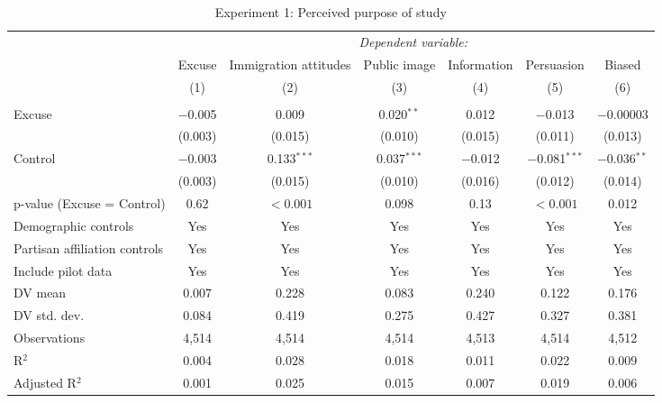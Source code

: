 
\begin{table}[!htbp] \centering 
  \caption{Experiment 1: Perceived purpose of study} 
  \label{t:2-purpose} 
\begin{threeparttable}
\begin{tabular}{@{\hspace{5pt}}l@{\hspace{5pt}}cccccc} 
\toprule 
 & \multicolumn{6}{c}{\textit{Dependent variable:}} \\ 
\cmidrule(rr){2-7} 
 & Excuse & Immigration attitudes & Public image & Information & Persuasion & Biased \\ 
 & (1) & (2) & (3) & (4) & (5) & (6)\\ 
\midrule  
\\[-2.1ex] Excuse & $-$0.005 & 0.009 & 0.020$^{**}$ & 0.012 & $-$0.013 & $-$0.00003 \\ 
  & (0.003) & (0.015) & (0.010) & (0.015) & (0.011) & (0.013) \\ 
 \addlinespace 
 Control & $-$0.003 & 0.133$^{***}$ & 0.037$^{***}$ & $-$0.012 & $-$0.081$^{***}$ & $-$0.036$^{**}$ \\ 
  & (0.003) & (0.015) & (0.010) & (0.016) & (0.012) & (0.014) \\ 
 \addlinespace 
p-value (Excuse = Control) & 0.62 & $<0.001$ & 0.098 & 0.13 & $<0.001$ & 0.012 \\ 
\midrule  
Demographic controls & Yes & Yes & Yes & Yes & Yes & Yes \\ 
Partisan affiliation controls & Yes & Yes & Yes & Yes & Yes & Yes \\ 
\midrule
Include pilot data & Yes & Yes & Yes & Yes & Yes & Yes \\
\addlinespace
DV mean & 0.007 & 0.228 & 0.083 & 0.240 & 0.122 & 0.176 \\
DV std. dev. & 0.084 & 0.419 & 0.275 & 0.427 & 0.327 & 0.381 \\
Observations & 4,514 & 4,514 & 4,514 & 4,513 & 4,514 & 4,512 \\ 
R$^{2}$ & 0.004 & 0.028 & 0.018 & 0.011 & 0.022 & 0.009 \\ 
Adjusted R$^{2}$ & 0.001 & 0.025 & 0.015 & 0.007 & 0.019 & 0.006 \\ 
\bottomrule 
\end{tabular} 
\begin{tablenotes}
\footnotesize

\end{tablenotes}
\end{threeparttable}
\end{table}
